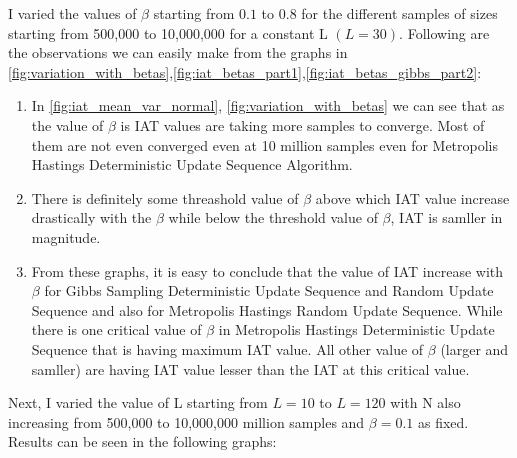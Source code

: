\documentclass[11pt]{article}
\begin{document}
I varied the values of $\beta$ starting from $0.1$ to $0.8$ for the different samples of sizes starting from 500,000 to 10,000,000 for a constant L $(L = 30)$.
Following are the observations we can easily make from the graphs in \ref{fig:variation_with_betas},\ref{fig:iat_betas_part1},\ref{fig:iat_betas_gibbs_part2}:
\begin{enumerate}
	\item In \ref{fig:iat_mean_var_normal}, \ref{fig:variation_with_betas} we can see that as the value of $\beta$ is IAT values are taking 
	more samples to converge. Most of them are not even converged even at 10 million samples even for Metropolis Hastings Deterministic Update Sequence Algorithm.
	\item There is definitely some threashold value of $\beta$ above which IAT value increase drastically with the $\beta$ while below the threshold value of $\beta$, IAT 
	is samller in magnitude.
	\item From these graphs, it is easy to conclude that the value of IAT increase with $\beta$ for Gibbs Sampling Deterministic Update Sequence and Random Update 
	Sequence and also for Metropolis Hastings Random Update Sequence. While there is one critical value of $\beta$ in Metropolis Hastings Deterministic Update 
	Sequence that is having maximum IAT value. All other value of $\beta$ (larger and samller) are having IAT value lesser than the IAT at this critical value.
\end{enumerate}

Next, I varied the value of L starting from $L = 10$ to $L  = 120$ with N also increasing from 500,000 to 10,000,000 million samples and $\beta = 0.1$ as fixed. Results can be seen in the following graphs:
\end{document}
